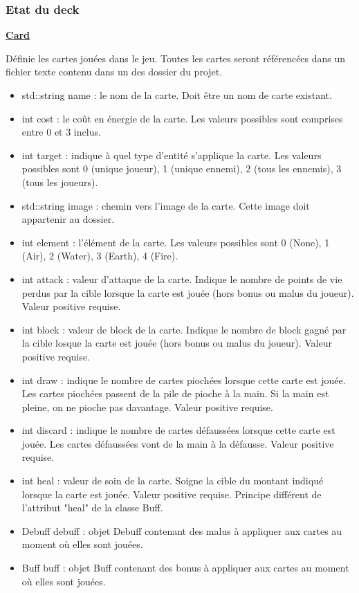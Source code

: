 \subsubsection{Etat du deck}
\underline{\textbf{Card}}
\par Définie les cartes jouées dans le jeu. Toutes les cartes seront référencées dans un fichier texte contenu dans un des dossier du projet.
\begin{itemize}
    \item std::string name : le nom de la carte. Doit être un nom de carte existant.
    \item int cost : le coût en énergie de la carte. Les valeurs possibles sont comprises entre 0 et 3 inclus.
    \item int target : indique à quel type d'entité s'applique la carte. Les valeurs possibles sont 0 (unique joueur), 1 (unique ennemi), 2 (tous les ennemis), 3 (tous les joueurs).
    \item std::string image : chemin vers l'image de la carte. Cette image doit appartenir au dossier.
    \item int element : l'élément de la carte. Les valeurs possibles sont 0 (None), 1 (Air), 2 (Water), 3 (Earth), 4 (Fire).
    \item int attack : valeur d'attaque de la carte. Indique le nombre de points de vie perdus par la cible lorsque la carte est jouée (hors bonus ou malus du joueur). Valeur positive requise.
    \item int block : valeur de block de la carte. Indique le nombre de block gagné par la cible losque la carte est jouée (hors bonus ou malus du joueur). Valeur positive requise.
    \item int draw : indique le nombre de cartes piochées lorsque cette carte est jouée. Les cartes piochées passent de la pile de pioche à la main. Si la main est pleine, on ne pioche pas davantage. Valeur positive requise.
    \item int discard : indique le nombre de cartes défaussées lorsque cette carte est jouée. Les cartes défaussées vont de la main à la défausse. Valeur positive requise.
    \item int heal : valeur de soin de la carte. Soigne la cible du montant indiqué lorsque la carte est jouée. Valeur positive requise. Principe différent de l'attribut "heal" de la classe Buff.
    \item Debuff debuff : objet Debuff contenant des malus à appliquer aux cartes au moment où elles sont jouées.
    \item Buff buff : objet Buff contenant des bonus à appliquer aux cartes au moment où elles sont jouées.
\end{itemize}

